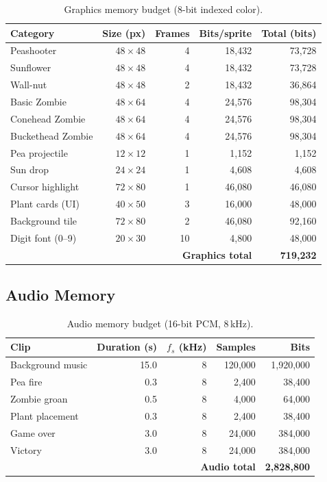 \documentclass[11pt,letterpaper]{article}
\begin{document}
\begin{table}[H]
\centering
\caption{Graphics memory budget (8-bit indexed color).}
\label{tab:gfx-mem}
\begin{tabular}{l r r r r}
\toprule
\textbf{Category} & \textbf{Size (px)} & \textbf{Frames} & \textbf{Bits/sprite} & \textbf{Total (bits)} \\
\midrule
Peashooter       & $48\times48$ & 4 & 18{,}432 &  73{,}728 \\
Sunflower        & $48\times48$ & 4 & 18{,}432 &  73{,}728 \\
Wall-nut         & $48\times48$ & 2 & 18{,}432 &  36{,}864 \\
Basic Zombie     & $48\times64$ & 4 & 24{,}576 &  98{,}304 \\
Conehead Zombie  & $48\times64$ & 4 & 24{,}576 &  98{,}304 \\
Buckethead Zombie& $48\times64$ & 4 & 24{,}576 &  98{,}304 \\
Pea projectile   & $12\times12$ & 1 &  1{,}152 &   1{,}152 \\
Sun drop         & $24\times24$ & 1 &  4{,}608 &   4{,}608 \\
Cursor highlight & $72\times80$ & 1 & 46{,}080 &  46{,}080 \\
Plant cards (UI) & $40\times50$ & 3 & 16{,}000 &  48{,}000 \\
Background tile  & $72\times80$ & 2 & 46{,}080 &  92{,}160 \\
Digit font (0--9)& $20\times30$ & 10&  4{,}800 &  48{,}000 \\
\midrule
\multicolumn{4}{r}{\textbf{Graphics total}} & \textbf{719{,}232} \\
\bottomrule
\end{tabular}
\end{table}

\subsection{Audio Memory}

\begin{table}[H]
\centering
\caption{Audio memory budget (16-bit PCM, 8\,kHz).}
\label{tab:audio-mem}
\begin{tabular}{l r r r r}
\toprule
\textbf{Clip} & \textbf{Duration (s)} & \textbf{$f_s$ (kHz)} & \textbf{Samples} & \textbf{Bits} \\
\midrule
Background music  & 15.0 & 8 & 120{,}000 & 1{,}920{,}000 \\
Pea fire          &  0.3 & 8 &   2{,}400 &    38{,}400 \\
Zombie groan      &  0.5 & 8 &   4{,}000 &    64{,}000 \\
Plant placement   &  0.3 & 8 &   2{,}400 &    38{,}400 \\
Game over         &  3.0 & 8 &  24{,}000 &   384{,}000 \\
Victory           &  3.0 & 8 &  24{,}000 &   384{,}000 \\
\midrule
\multicolumn{4}{r}{\textbf{Audio total}} & \textbf{2{,}828{,}800} \\
\bottomrule
\end{tabular}
\end{table}
\end{document}
